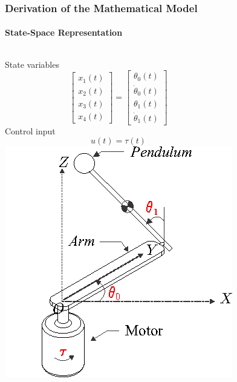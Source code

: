 \documentclass[]{beamer}
\begin{document}
\begin{frame}
	\frametitle{Derivation of the Mathematical Model}
	\framesubtitle{State-Space Representation}
	  	\begin{columns}[c]
		\column{2in}  %
State variables
\begin{equation*}
\begin{bmatrix}
x_1(t)\\x_2(t)\\x_3(t)\\x_4(t)
\end{bmatrix} = \begin{bmatrix}
\theta_0(t)\\\dot{\theta}_0(t)\\\theta_1(t)\\\dot{\theta}_1(t)
\end{bmatrix}
\end{equation*}
Control input
\begin{equation*}
u(t) = \tau (t)
\end{equation*}
		\column{2in}
		\includegraphics[scale=0.55]{images/furuta2.png}
	\end{columns}
\end{frame}
\end{document}

